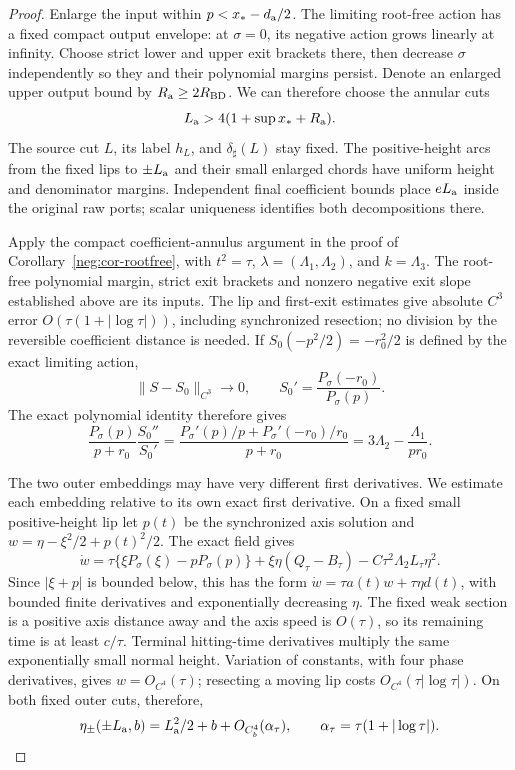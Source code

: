 \begin{proof}
Enlarge the input within \(p<x_*-d_{\rm a}/2\). The limiting
root-free action has a fixed compact output envelope: at \(\sigma=0\),
its negative action grows linearly at infinity. Choose strict lower
and upper exit brackets there, then decrease \(\sigma\) independently
so they and their polynomial margins persist. Denote an enlarged
upper output bound by \(R_{\rm a}\ge2R_{\rm BD}\). We can therefore choose the annular cuts
\[
 L_{\rm a}>4(1+\sup x_*+R_{\rm a}).
\]
The source cut \(L\), its label \(h_L\), and
\(\delta_\sharp(L)\) stay fixed. The positive-height arcs from the
fixed lips to \(\pm L_{\rm a}\) and their small enlarged chords
have uniform height and denominator margins. Independent final
coefficient bounds place \(eL_{\rm a}\) inside the original raw
ports; scalar uniqueness identifies both decompositions there.

Apply the compact coefficient-annulus argument in the proof of
Corollary~\ref{neg:cor-rootfree}, with \(t^2=\tau\),
\(\lambda=(\Lambda_1,\Lambda_2)\), and \(k=\Lambda_3\).
The root-free polynomial margin, strict exit brackets and nonzero
negative exit slope established above are its inputs. The lip and
first-exit estimates give absolute \(C^3\) error
\(O(\tau(1+|\log\tau|))\), including synchronized resection;
no division by the reversible coefficient distance is needed. If
\(S_0(-p^2/2)=-r_0^2/2\) is defined by the exact limiting action,
\begin{equation}\label{bd:annular-first}
 \|S-S_0\|_{C^3}\longrightarrow0,\qquad
 S_0'=\frac{P_\sigma(-r_0)}{P_\sigma(p)} .
\end{equation}
The exact polynomial identity therefore gives
\[
 \frac{P_\sigma(p)}{p+r_0}\frac{S_0''}{S_0'}
 =\frac{P_\sigma'(p)/p+P_\sigma'(-r_0)/r_0}{p+r_0}
 =3\Lambda_2-\frac{\Lambda_1}{pr_0} .
\]

The two outer embeddings may have very different first derivatives.
We estimate each embedding relative to its own exact first derivative.
On a fixed small positive-height lip let \(p(t)\) be the synchronized
axis solution and \(w=\eta-\xi^2/2+p(t)^2/2\).
The exact field gives
\[
 \dot w=\tau\{\xi P_\sigma(\xi)-pP_\sigma(p)\}
 +\xi\eta(Q_\tau-B_\tau)
 -C\tau^2\Lambda_2L_\tau\eta^2.
\]
Since \(|\xi+p|\) is bounded below, this has the form
\(\dot w=\tau a(t)w+\tau\eta d(t)\), with bounded finite
derivatives and exponentially decreasing \(\eta\).  The fixed
weak section is a positive axis distance away and the axis speed is
\(O(\tau)\), so its remaining time is at least \(c/\tau\).
Terminal hitting-time derivatives multiply the same exponentially
small normal height.  Variation of constants, with four phase
derivatives, gives \(w=O_{C^4}(\tau)\); resecting a moving lip
costs \(O_{C^4}(\tau|\log\tau|)\).  On both fixed outer cuts,
therefore,
\begin{equation}\label{bd:annular-tail-data}
 \eta_\pm(\pm L_{\rm a},b)=L_{\rm a}^2/2+b+
                  O_{C_b^4}(\alpha_\tau),\qquad
 \alpha_\tau=\tau(1+|\log\tau|).
\end{equation}


\end{proof}
